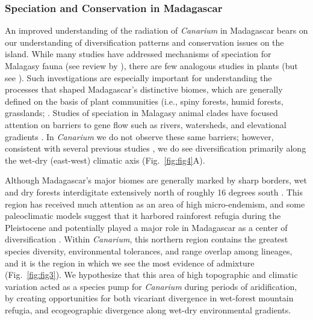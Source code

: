 \documentclass[10pt,letterpaper]{article}
\begin{document}
\subsubsection*{Speciation and Conservation in Madagascar}
An improved understanding of the radiation of \emph{Canarium} in Madagascar bears on our understanding of diversification patterns and conservation issues on the island. While many studies have addressed mechanisms of speciation for Malagasy fauna (see review by \cite{vences_madagascar_2009}), there are few analogous studies in plants (but see \cite{janssen_neoendemism_2008}). Such investigations are especially important for understanding the processes that shaped Madagascar’s distinctive biomes, which are generally defined on the basis of plant communities (i.e., spiny forests, humid forests, grasslands; \cite{yoder_has_2006,vences_madagascar_2009}. Studies of speciation in Malagasy animal clades have focused attention on barriers to gene flow such as rivers, watersheds, and elevational gradients \cite{martin_review_1972,raxworthy_systematics_1995,raxworthy_applications_2007}. In \emph{Canarium} we do not observe these same barriers; however, consistent with several previous studies \cite{yoder_has_2006,vences_madagascar_2009,yoder_geogenetic_2016}, we do see diversification primarily along the wet-dry (east-west) climatic axis (Fig.~\ref{fig:fig4}A). 

Although Madagascar’s major biomes are generally marked by sharp borders, wet and dry forests interdigitate extensively north of roughly 16 degrees south \cite{vences_madagascar_2009}. This region has received much attention as an area of high micro-endemism, and some paleoclimatic models suggest that it harbored rainforest refugia during the Pleistocene \cite{ray_gis-based_2001} and potentially played a major role in Madagascar as a center of diversification \cite{raxworthy_systematics_1995,vences_madagascar_2009}. Within \emph{Canarium}, this northern region contains the greatest species diversity, environmental tolerances, and range overlap among lineages, and it is the region in which we see the most evidence of admixture (Fig.~\ref{fig:fig3}). We hypothesize that this area of high topographic and climatic variation acted as a species pump for \emph{Canarium} during periods of aridification, by creating opportunities for both vicariant divergence in wet-forest mountain refugia, and ecogeographic divergence along wet-dry environmental gradients.
\end{document}
